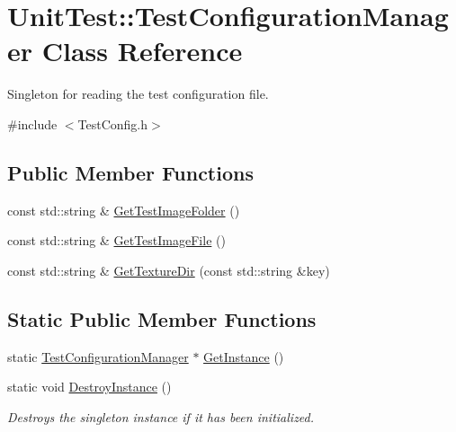\hypertarget{class_unit_test_1_1_test_configuration_manager}{}\section{Unit\+Test\+::Test\+Configuration\+Manager Class Reference}
\label{class_unit_test_1_1_test_configuration_manager}


Singleton for reading the test configuration file.  




{\ttfamily \#include $<$Test\+Config.\+h$>$}

\subsection*{Public Member Functions}
\begin{DoxyCompactItemize}
\item 
const std\+::string \& \mbox{\hyperlink{class_unit_test_1_1_test_configuration_manager_a246758c1638ac8a8966c7d0e8e02085b}{Get\+Test\+Image\+Folder}} ()
\item 
const std\+::string \& \mbox{\hyperlink{class_unit_test_1_1_test_configuration_manager_a68bc437de34df3e796fc6fde731c4803}{Get\+Test\+Image\+File}} ()
\item 
const std\+::string \& \mbox{\hyperlink{class_unit_test_1_1_test_configuration_manager_a9467f8835450de0622c9be41cf88ed79}{Get\+Texture\+Dir}} (const std\+::string \&key)
\end{DoxyCompactItemize}
\subsection*{Static Public Member Functions}
\begin{DoxyCompactItemize}
\item 
static \mbox{\hyperlink{class_unit_test_1_1_test_configuration_manager}{Test\+Configuration\+Manager}} $\ast$ \mbox{\hyperlink{class_unit_test_1_1_test_configuration_manager_a0d67d9b3fda9041d13927c6d2d42085b}{Get\+Instance}} ()
\item 
\mbox{\label{class_unit_test_1_1_test_configuration_manager_a965b58cfa5a213da7a0f239f2b3f994f}} 
static void \mbox{\hyperlink{class_unit_test_1_1_test_configuration_manager_a965b58cfa5a213da7a0f239f2b3f994f}{Destroy\+Instance}} ()
\begin{DoxyCompactList}\small\item\em Destroys the singleton instance if it has been initialized. \end{DoxyCompactList}\end{DoxyCompactItemize}


